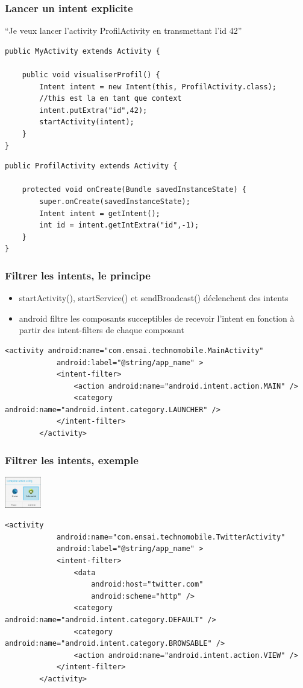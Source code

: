 \documentclass{beamer}
\begin{document}
\begin{frame}[fragile]
\frametitle{Lancer un intent explicite}
``Je veux lancer l'activity ProfilActivity en transmettant l'id 42''
\begin{lstlisting}
public MyActivity extends Activity {
    
    public void visualiserProfil() {
        Intent intent = new Intent(this, ProfilActivity.class); 
        //this est la en tant que context
        intent.putExtra("id",42);
        startActivity(intent);
    }	
}
\end{lstlisting}

\begin{lstlisting}
public ProfilActivity extends Activity {
    
    protected void onCreate(Bundle savedInstanceState) {
        super.onCreate(savedInstanceState);
        Intent intent = getIntent();
        int id = intent.getIntExtra("id",-1);
    }
}
\end{lstlisting}
\end{frame}

\begin{frame}[fragile]
\frametitle{Filtrer les intents, le principe}
\begin{itemize}
    \item startActivity(), startService() et sendBroadcast() déclenchent des
    intents
	\item android filtre les composants succeptibles de recevoir l'intent en
	fonction à partir des intent-filters de chaque composant
\end{itemize}

\begin{lstlisting}
<activity android:name="com.ensai.technomobile.MainActivity"
            android:label="@string/app_name" >
            <intent-filter>
                <action android:name="android.intent.action.MAIN" />
                <category android:name="android.intent.category.LAUNCHER" />
            </intent-filter>
        </activity>
\end{lstlisting}
\end{frame}
\begin{frame}[fragile]
\frametitle{Filtrer les intents, exemple}
\includegraphics[width=45pt]{intentchooser.jpg}
\begin{lstlisting}
<activity
            android:name="com.ensai.technomobile.TwitterActivity"
            android:label="@string/app_name" >
            <intent-filter>
                <data
                    android:host="twitter.com"
                    android:scheme="http" />
                <category android:name="android.intent.category.DEFAULT" />
                <category android:name="android.intent.category.BROWSABLE" />
                <action android:name="android.intent.action.VIEW" />
            </intent-filter>
        </activity>
\end{lstlisting}
\end{frame}
\end{document}
